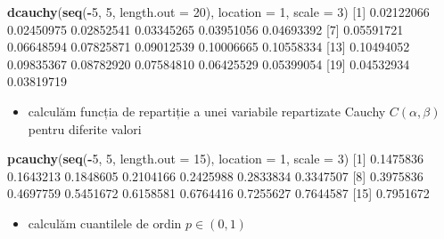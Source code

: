 \documentclass[]{article}
\newenvironment{Shaded}{\begin{snugshade}}{\end{snugshade}}
\newcommand{\KeywordTok}[1]{\textcolor[rgb]{0.13,0.29,0.53}{\textbf{#1}}}
\newcommand{\DataTypeTok}[1]{\textcolor[rgb]{0.13,0.29,0.53}{#1}}
\newcommand{\DecValTok}[1]{\textcolor[rgb]{0.00,0.00,0.81}{#1}}
\newcommand{\FloatTok}[1]{\textcolor[rgb]{0.00,0.00,0.81}{#1}}
\newcommand{\OperatorTok}[1]{\textcolor[rgb]{0.81,0.36,0.00}{\textbf{#1}}}
\newcommand{\NormalTok}[1]{#1}
\providecommand{\tightlist}{%
  \setlength{\itemsep}{0pt}\setlength{\parskip}{0pt}}
\begin{document}
\begin{Shaded}
\begin{Highlighting}[]
\KeywordTok{dcauchy}\NormalTok{(}\KeywordTok{seq}\NormalTok{(}\OperatorTok{-}\DecValTok{5}\NormalTok{, }\DecValTok{5}\NormalTok{, }\DataTypeTok{length.out =} \DecValTok{20}\NormalTok{), }\DataTypeTok{location =} \DecValTok{1}\NormalTok{, }\DataTypeTok{scale =} \DecValTok{3}\NormalTok{)}
\NormalTok{ [}\DecValTok{1}\NormalTok{] }\FloatTok{0.02122066} \FloatTok{0.02450975} \FloatTok{0.02852541} \FloatTok{0.03345265} \FloatTok{0.03951056} \FloatTok{0.04693392}
\NormalTok{ [}\DecValTok{7}\NormalTok{] }\FloatTok{0.05591721} \FloatTok{0.06648594} \FloatTok{0.07825871} \FloatTok{0.09012539} \FloatTok{0.10006665} \FloatTok{0.10558334}
\NormalTok{[}\DecValTok{13}\NormalTok{] }\FloatTok{0.10494052} \FloatTok{0.09835367} \FloatTok{0.08782920} \FloatTok{0.07584810} \FloatTok{0.06425529} \FloatTok{0.05399054}
\NormalTok{[}\DecValTok{19}\NormalTok{] }\FloatTok{0.04532934} \FloatTok{0.03819719}
\end{Highlighting}
\end{Shaded}

\begin{itemize}
\tightlist
\item
  calculăm funcția de repartiție a unei variabile repartizate Cauchy
  \(C(\alpha, \beta)\) pentru diferite valori
\end{itemize}

\begin{Shaded}
\begin{Highlighting}[]
\KeywordTok{pcauchy}\NormalTok{(}\KeywordTok{seq}\NormalTok{(}\OperatorTok{-}\DecValTok{5}\NormalTok{, }\DecValTok{5}\NormalTok{, }\DataTypeTok{length.out =} \DecValTok{15}\NormalTok{), }\DataTypeTok{location =} \DecValTok{1}\NormalTok{, }\DataTypeTok{scale =} \DecValTok{3}\NormalTok{)}
\NormalTok{ [}\DecValTok{1}\NormalTok{] }\FloatTok{0.1475836} \FloatTok{0.1643213} \FloatTok{0.1848605} \FloatTok{0.2104166} \FloatTok{0.2425988} \FloatTok{0.2833834} \FloatTok{0.3347507}
\NormalTok{ [}\DecValTok{8}\NormalTok{] }\FloatTok{0.3975836} \FloatTok{0.4697759} \FloatTok{0.5451672} \FloatTok{0.6158581} \FloatTok{0.6764416} \FloatTok{0.7255627} \FloatTok{0.7644587}
\NormalTok{[}\DecValTok{15}\NormalTok{] }\FloatTok{0.7951672}
\end{Highlighting}
\end{Shaded}

\begin{itemize}
\tightlist
\item
  calculăm cuantilele de ordin \(p\in(0,1)\)
\end{itemize}
\end{document}
